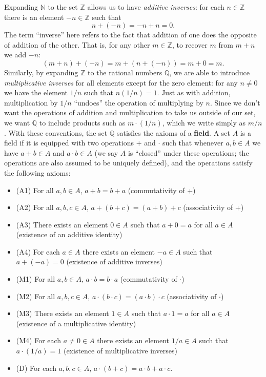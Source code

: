 \documentclass[letterpaper,12pt]{article}
\newcommand{\N}{\mathbb{N}}
\newcommand{\Z}{\mathbb{Z}}
\newcommand{\Q}{\mathbb{Q}}
\begin{document}
Expanding $\N$ to the set $\Z$ allows us to have {\em additive inverses}: for each $n\in\Z$ there is an element $-n\in\Z$ such that
\[
 n+(-n) = -n+n = 0.
\]
The term ``inverse'' here refers to the fact that addition of one does the opposite of addition of the other. That is, for any other $m\in \Z$, to recover $m$ from $m+n$ we add $-n$:
\[
 (m+n)+(-n) = m+(n+(-n)) = m+0 = m.
\]
Similarly, by expanding $\Z$ to the rational numbers $\Q$, we are able to introduce {\em multiplicative inverses} for all elements except for the zero element: for any $n\neq 0$ we have the element $1/n$ such that $n(1/n)=1$. Just as with addition, multiplication by $1/n$ ``undoes'' the operation of multiplying by $n$. Since we don't want the operations of addition and multiplication to take us outside of our set, we want $\Q$ to include products such as $m\cdot (1/n)$, which we write simply as $m/n$. With these conventions, the set $\Q$ satisfies the axioms of a {\bf field}. A set $A$ is a field if it is equipped with two operations $+$ and $\cdot$ such that whenever $a,b\in A$ we have $a+b\in A$ and $a\cdot b\in A$ (we say $A$ is ``closed'' under these operations; the operations are also assumed to be uniquely defined), and the operations satisfy the following axioms:
\begin{itemize}
 \item (A1) For all $a,b\in A$, $a+b=b+a$ (commutativity of +)
 \item (A2) For all $a,b,c\in A$, $a+(b+c)=(a+b)+c$ (associativity of +)
 \item (A3) There exists an element $0\in A$ such that $a+0=a$ for all $a\in A$ (existence of an additive identity)
 \item (A4) For each $a\in A$ there exists an element $-a\in A$ such that $a+(-a)=0$ (existence of additive inverses)
 \item (M1) For all $a,b\in A$, $a\cdot b=b\cdot a$ (commutativity of $\cdot$)
 \item (M2) For all $a,b,c\in A$, $a\cdot(b\cdot c)=(a\cdot b)\cdot c$ (associativity of $\cdot$)
 \item (M3) There exists an element $1\in A$ such that $a\cdot 1=a$ for all $a\in A$ (existence of a multiplicative identity)
 \item (M4) For each $a\neq 0\in A$ there exists an element $1/a\in A$ such that $a\cdot(1/a)=1$ (existence of multiplicative inverses)
 \item (D) For each $a,b,c\in A$, $a\cdot(b+c) = a\cdot b+a\cdot c$.
\end{itemize}
\end{document}
